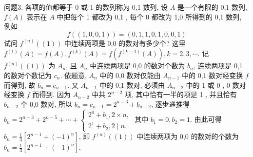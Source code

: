问题3. 各项的值都等于 0 或 1 的数列称为 0,1 数列, 设 $A$ 是一个有限的 0,1 数列, $f(A)$ 表示在 $A$ 中把每个 1 都改为 0,1 , 每个 0 都改为 1,0 所得到的 0,1 数列, 例如
$$
f((1,0,0,1))=(0,1,1,0,1,0,0,1)
$$
试问 $f^{(n)}((1))$ 中连续两项是 0,0 的数对有多少个? 这里 $f^{(1)}(A)= f(A), f^{(k)}(A)=f\left(f^{(k-1)}(A)\right), k=2,3, \cdots$.
记 $f^{(n)}((1))$ 为 $A_n$, 且 $A_n$ 中连续两项是 0,0 的数对个数为 $b_n$, 连续两项是 0,1 的数对个数记为 $c_n$. 依题意, $A_n$ 中的 0,0 数对仅能由 $A_{n-1}$ 中的 0,1 数对经变换 $f$ 而得到, 故 $b_n=c_{n-1}$. 又 $A_{n-1}$ 中的 0,1 数对, 必须由 $A_{n-2}$ 中的 1 或 0 , 0 数对经变换 $f$ 而得到.
因为 $A_{n-2}$ 中共 $2^{n-2}$ 项, 其中恰有一半的项是 1 , 并且恰有 $b_{n-2}$ 个 0,0 数对, 所以 $b_n=c_{n-1}=2^{n-3}+b_{n-2}$, 逐步递推得 $b_n=2^{n-3}+ 2^{n-5}+\cdots+\left\{\begin{array}{l}2^0+b_1, 2 \times n, \\ 2^1+b_2, 2 \mid n \text {. }\end{array}\right.$ 其中 $b_1=0, b_2=1$. 由此可得 $b_n=\frac{1}{3}\left[2^{n-1}+(-1)^n\right]$, 即 $f^{(n)}((1))$ 中连续两项为 0,0 的数对的个数为 $b_n=\frac{1}{3}\left[2^{n-1}+(-1)^n\right]$.




